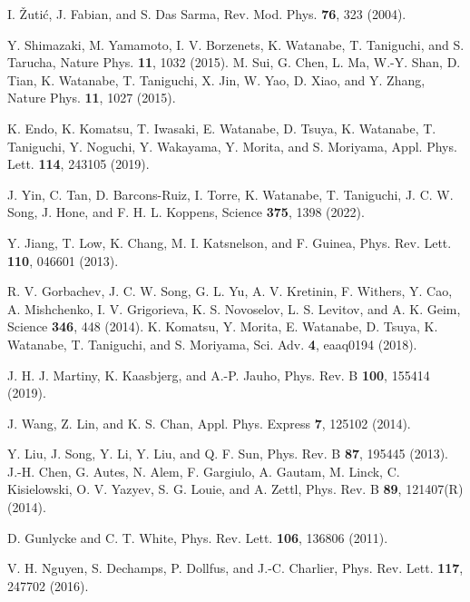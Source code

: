 \documentclass{jpsj3}
\begin{document}
\begin{thebibliography}{99}
I. \v{Z}uti\'{c}, J. Fabian, and S. Das Sarma, Rev. Mod. Phys. {\bf 76}, 323 (2004).


Y. Shimazaki, 
M. Yamamoto, 
I. V. Borzenets, 
K. Watanabe, 
T. Taniguchi, and 
S. Tarucha, Nature Phys. {\bf 11}, 1032 (2015).
M. Sui, G. Chen, L. Ma, W.-Y. Shan, D. Tian, K. Watanabe, T. Taniguchi, X. Jin, W. Yao, D. Xiao, and Y. Zhang, Nature Phys. {\bf 11}, 1027 (2015).

K. Endo, K. Komatsu, T. Iwasaki, E. Watanabe, D. Tsuya, K. Watanabe, T. Taniguchi, Y. Noguchi, Y. Wakayama, Y. Morita, and S. Moriyama, 
Appl. Phys. Lett. {\bf 114}, 243105 (2019).






J. Yin, C. Tan, D. Barcons-Ruiz, I. Torre, K. Watanabe, T. Taniguchi, J. C. W. Song, J. Hone, and F. H. L. Koppens, Science {\bf 375}, 1398 (2022).

Y. Jiang, 
T. Low, 
K. Chang, 
M. I. Katsnelson, and
F. Guinea, 
Phys. Rev. Lett. {\bf 110}, 046601 (2013).



R. V. Gorbachev, J. C. W. Song, G. L. Yu, A. V. Kretinin, F. Withers, Y. Cao, A. Mishchenko, I. V. Grigorieva, K. S. Novoselov, L. S. Levitov, and A. K. Geim, Science {\bf 346}, 448 (2014).
K. Komatsu, 
Y. Morita, 
E. Watanabe, 
D. Tsuya, 
K. Watanabe, 
T. Taniguchi, and 
S. Moriyama, Sci. Adv. {\bf 4}, eaaq0194 (2018).

J. H. J. Martiny, K. Kaasbjerg, and A.-P. Jauho, Phys. Rev. B {\bf 100}, 155414 (2019).

 J. Wang, Z. Lin, and K. S. Chan, Appl. Phys. Express {\bf 7}, 125102 (2014).


Y. Liu, J. Song, Y. Li, Y. Liu, and Q. F. Sun, 
Phys. Rev. B 
{\bf 87}, 195445 (2013).
J.-H. Chen, G. Autes, N. Alem, F. Gargiulo, A. Gautam, M. Linck, C. Kisielowski, O. V. Yazyev, S. G. Louie, and A. Zettl, 
Phys. Rev. B 
{\bf 89}, 121407(R) (2014).

D. Gunlycke and C. T. White, Phys. Rev. Lett. {\bf 106}, 136806 (2011).

V. H. Nguyen, S. Dechamps, P. Dollfus, and J.-C. Charlier, 
Phys. Rev. Lett.
{\bf 117}, 247702 (2016).


\end{thebibliography}
\end{document}
